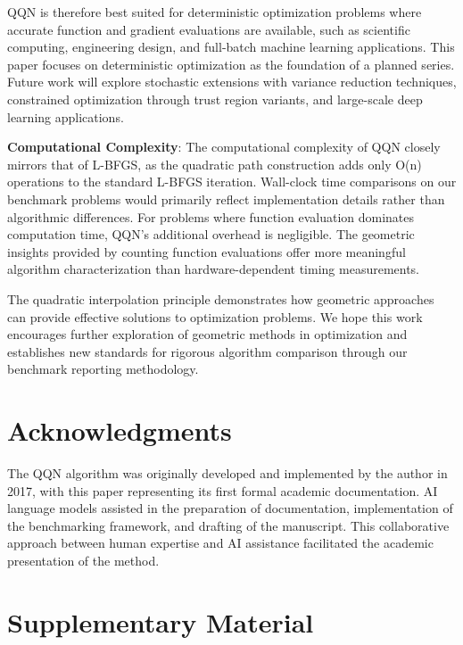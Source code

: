 QQN is therefore best suited for deterministic optimization problems where accurate function and gradient evaluations are available, such as scientific computing, engineering design, and full-batch machine learning applications. This paper focuses on deterministic optimization as the foundation of a planned series. Future work will explore stochastic extensions with variance reduction techniques, constrained optimization through trust region variants, and large-scale deep learning applications.

\textbf{Computational Complexity}: The computational complexity of QQN closely mirrors that of L-BFGS, as the quadratic path construction adds only O(n) operations to the standard L-BFGS iteration.
Wall-clock time comparisons on our benchmark problems would primarily reflect implementation details rather than algorithmic differences.
For problems where function evaluation dominates computation time, QQN's additional overhead is negligible.
The geometric insights provided by counting function evaluations offer more meaningful algorithm characterization than hardware-dependent timing measurements.

The quadratic interpolation principle demonstrates how geometric approaches can provide effective solutions to optimization problems.
We hope this work encourages further exploration of geometric methods in optimization and establishes new standards for rigorous algorithm comparison through our benchmark reporting methodology.

\hypertarget{acknowledgments}{%
\section{Acknowledgments}\label{acknowledgments}}

The QQN algorithm was originally developed and implemented by the author in 2017, with this paper representing its first formal academic documentation.
AI language models assisted in the preparation of documentation, implementation of the benchmarking framework, and drafting of the manuscript.
This collaborative approach between human expertise and AI assistance facilitated the academic presentation of the method.

\hypertarget{supplementary-material}{%
\section{Supplementary Material}\label{supplementary-material}}

